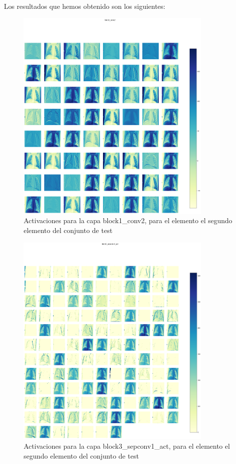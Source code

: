 \documentclass[11pt,a4paper]{article}
\theoremstyle{definition}
\begin{document}
Los resultados que hemos obtenido son los siguientes:\\

\begin{figure}[]
\centering
\includegraphics[width=0.85\textwidth]{./images/actmap.png}
\caption{Activaciones para la capa block1\_conv2, para el elemento el segundo elemento del conjunto de test}
\end{figure}

\begin{figure}[]
\centering
\includegraphics[width=0.85\textwidth]{./images/actmap2.png}
\caption{Activaciones para la capa block3\_sepconv1\_act, para el elemento el segundo elemento del conjunto de test}
\end{figure}
\end{document}
